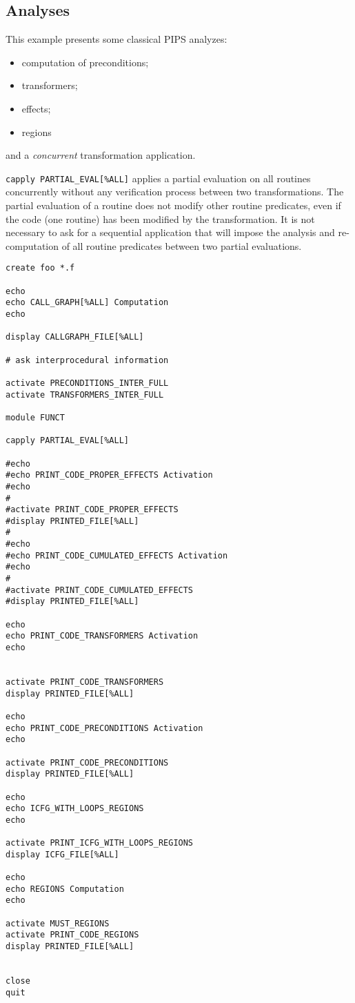 \documentclass[a4paper,12pt]{article}
\begin{document}
\subsection{Analyses}
\label{exm4}

This example presents some classical PIPS analyzes:

\begin{itemize}
\item computation of preconditions;
\item transformers;
\item effects;
\item regions
\end{itemize}
and a {\it concurrent} transformation application.

\verb+capply PARTIAL_EVAL[%ALL]+
applies a partial evaluation on all routines concurrently without any
verification process between two transformations. The partial evaluation
of a routine does not modify other routine predicates, even if the code
(one routine) has been modified by the transformation. It is not
necessary to ask for a sequential application that will impose the
analysis and re-computation of all routine predicates between two partial
evaluations.

\begin{verbatim}
create foo *.f

echo
echo CALL_GRAPH[%ALL] Computation
echo

display CALLGRAPH_FILE[%ALL]

# ask interprocedural information

activate PRECONDITIONS_INTER_FULL
activate TRANSFORMERS_INTER_FULL

module FUNCT

capply PARTIAL_EVAL[%ALL]

#echo
#echo PRINT_CODE_PROPER_EFFECTS Activation
#echo
#
#activate PRINT_CODE_PROPER_EFFECTS
#display PRINTED_FILE[%ALL]
#
#echo
#echo PRINT_CODE_CUMULATED_EFFECTS Activation
#echo
#
#activate PRINT_CODE_CUMULATED_EFFECTS
#display PRINTED_FILE[%ALL]

echo
echo PRINT_CODE_TRANSFORMERS Activation
echo


activate PRINT_CODE_TRANSFORMERS
display PRINTED_FILE[%ALL]

echo
echo PRINT_CODE_PRECONDITIONS Activation
echo

activate PRINT_CODE_PRECONDITIONS
display PRINTED_FILE[%ALL]

echo
echo ICFG_WITH_LOOPS_REGIONS
echo 

activate PRINT_ICFG_WITH_LOOPS_REGIONS
display ICFG_FILE[%ALL]

echo 
echo REGIONS Computation
echo

activate MUST_REGIONS
activate PRINT_CODE_REGIONS
display PRINTED_FILE[%ALL]


close 
quit
\end{verbatim}
\end{document}
